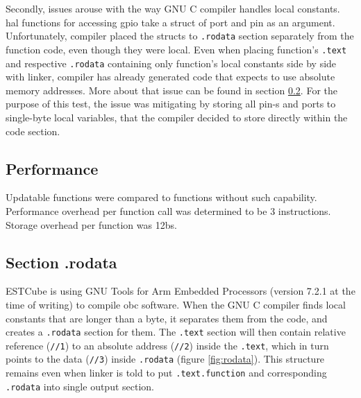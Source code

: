Secondly, issues arouse with the way GNU C compiler handles local constants. \Gls{hal} functions for accessing \gls{gpio} take a struct of port and pin as an argument. Unfortunately, compiler placed the structs to \texttt{.rodata} section separately from the function code, even though they were local. Even when placing function's \texttt{.text} and respective \texttt{.rodata} containing only function's local constants side by side with linker, compiler has already generated code that expects to use absolute memory addresses. More about that issue can be found in section \ref{s:rodata}. For the purpose of this test, the issue was mitigating by storing all pin-s and ports to single-byte local variables, that the compiler decided to store directly within the code section.

\subsection{Performance}

Updatable functions were compared to functions without such capability. Performance overhead per function call was determined to be 3 instructions. Storage overhead per function was 12\glspl{b}.



\subsection{Section .rodata}\label{s:rodata}

ESTCube is using GNU Tools for Arm Embedded Processors (version 7.2.1 at the time of writing) to compile \gls{obc} software. When the GNU C compiler finds local constants that are longer than a byte, it separates them from the code, and creates a \texttt{.rodata} section for them. The \texttt{.text} section will then contain relative reference (\texttt{//1}) to an absolute address (\texttt{//2}) inside the \texttt{.text}, which in turn points to the data (\texttt{//3}) inside \texttt{.rodata} (figure \ref{fig:rodata}). This structure remains even when linker is told to put \texttt{.text.function} and corresponding \texttt{.rodata} into single output section.

